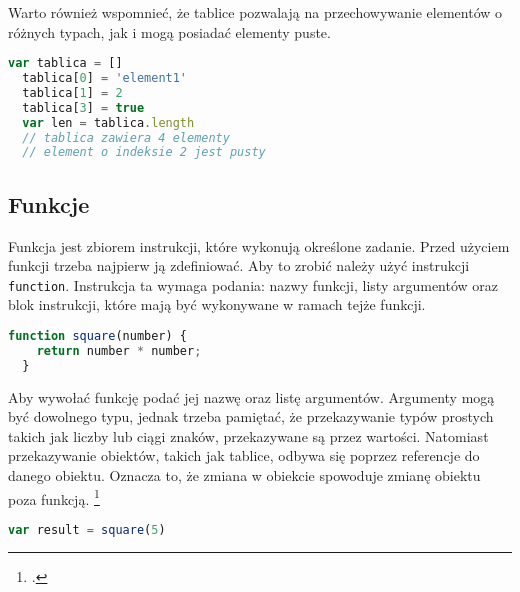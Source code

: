 \par Warto również wspomnieć, że tablice pozwalają na przechowywanie elementów o różnych typach, jak i mogą posiadać elementy puste.

\begin{lstlisting}[language=JavaScript, caption=Przykład przypisania elementów o różnych typach , label=alg:array5]
  var tablica = []
  tablica[0] = 'element1'
  tablica[1] = 2
  tablica[3] = true
  var len = tablica.length 
  // tablica zawiera 4 elementy
  // element o indeksie 2 jest pusty
\end{lstlisting}

\subsection{Funkcje}

\par Funkcja jest zbiorem instrukcji, które wykonują określone zadanie. Przed użyciem funkcji trzeba najpierw ją zdefiniować. Aby to zrobić należy użyć instrukcji \texttt{function}. Instrukcja ta wymaga podania: nazwy funkcji, listy argumentów oraz blok instrukcji, które mają być wykonywane w ramach tejże funkcji.

\begin{lstlisting}[language=JavaScript, caption=Przykład deklaracji funkcji, label=alg:function1]
  function square(number) {
    return number * number;
  }
\end{lstlisting}

\par Aby wywołać funkcję podać jej nazwę oraz listę argumentów. Argumenty mogą być dowolnego typu, jednak trzeba pamiętać, że przekazywanie typów prostych takich jak liczby lub ciągi znaków, przekazywane są przez wartości. Natomiast przekazywanie obiektów, takich jak tablice, odbywa się poprzez referencje do danego obiektu. Oznacza to, że zmiana w obiekcie spowoduje zmianę obiektu poza funkcją. \footcite{jsFunctions}

\begin{lstlisting}[language=JavaScript, caption=Przykład uzycia funkcji, label=alg:function2]
  var result = square(5)
\end{lstlisting}

